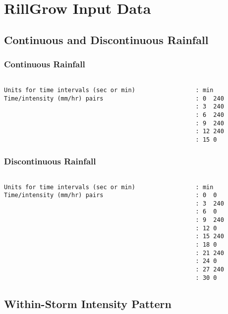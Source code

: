 \chapter{RillGrow Input Data}
\label{sec:RillGrowInputData}

\section{Continuous and Discontinuous Rainfall}

\subsection{Continuous Rainfall}

\begin{verbatim}

Units for time intervals (sec or min)                 : min
Time/intensity (mm/hr) pairs                          : 0  240
                                                      : 3  240
                                                      : 6  240
                                                      : 9  240
                                                      : 12 240
                                                      : 15 0
\end{verbatim}

\subsection{Discontinuous Rainfall}

\begin{verbatim}

Units for time intervals (sec or min)                 : min
Time/intensity (mm/hr) pairs                          : 0  0
                                                      : 3  240
                                                      : 6  0
                                                      : 9  240
                                                      : 12 0
                                                      : 15 240
                                                      : 18 0
                                                      : 21 240
                                                      : 24 0
                                                      : 27 240
                                                      : 30 0

\end{verbatim}

\section{Within-Storm Intensity Pattern}


